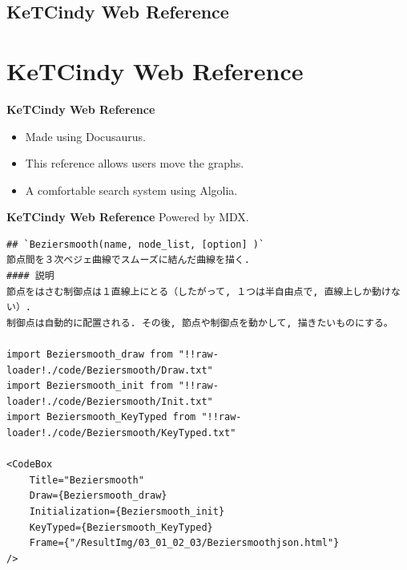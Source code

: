 \documentclass[dvipdfmx, unicode, 169]{beamer}
\begin{document}

\subsection{KeTCindy Web Reference}
\section*{KeTCindy Web Reference}

\begin{frame}[t]{\bfseries KeTCindy Web Reference}
  \begin{itemize}
    \item Made using Docusaurus.
    \item This reference allows users move the graphs.
    \item A comfortable search system using Algolia.
  \end{itemize}
\end{frame}

\begin{frame}[fragile]{\bfseries KeTCindy Web Reference}
  Powered by MDX.
  \begin{lstlisting}
## `Beziersmooth(name, node_list, [option] )`
節点間を３次ベジェ曲線でスムーズに結んだ曲線を描く.
#### 説明
節点をはさむ制御点は１直線上にとる（したがって, １つは半自由点で, 直線上しか動けない）.
制御点は自動的に配置される. その後, 節点や制御点を動かして, 描きたいものにする。  

import Beziersmooth_draw from "!!raw-loader!./code/Beziersmooth/Draw.txt"
import Beziersmooth_init from "!!raw-loader!./code/Beziersmooth/Init.txt"
import Beziersmooth_KeyTyped from "!!raw-loader!./code/Beziersmooth/KeyTyped.txt"

<CodeBox 
    Title="Beziersmooth"
    Draw={Beziersmooth_draw}
    Initialization={Beziersmooth_init}
    KeyTyped={Beziersmooth_KeyTyped}
    Frame={"/ResultImg/03_01_02_03/Beziersmoothjson.html"}
/>\end{lstlisting}
\end{frame}
\end{document}
